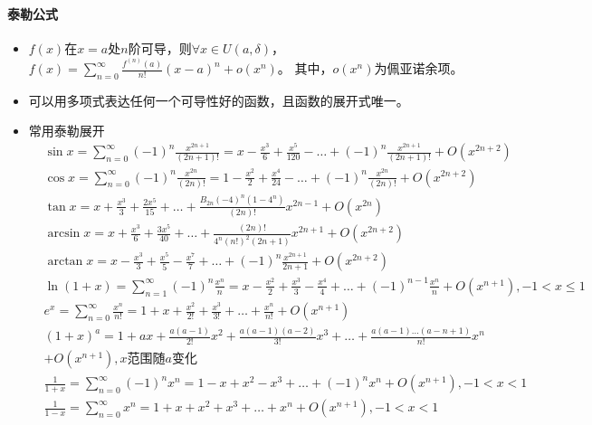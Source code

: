 \documentclass[
12pt, %
a4paper, 
oneside, %
headinclude,footinclude, %
]{scrartcl}
\begin{document}
\paragraph{泰勒公式}
\begin{itemize}
\item $ f(x) $在$ x = a $处$ n $阶可导，则$ \forall x \in U(a, \delta) $，
$ f(x) = \sum_{n = 0}^{\infty} \frac{f^{(n)}(a)}{n!}(x - a)^n + o(x^n) $。
其中，$ o(x^n) $为佩亚诺余项。
\item 可以用多项式表达任何一个可导性好的函数，且函数的展开式唯一。
\item 常用泰勒展开
\begin{align*}
&\sin x = \sum_{n = 0}^{\infty} (-1)^n \frac{x^{2n + 1}}{(2n + 1)!} = x - \frac{x^3}{6} + \frac{x^5}{120} - \dots + (-1)^n \frac{x^{2n + 1}}{(2n + 1)!} + O(x^{2n + 2}) \\
&\cos x = \sum_{n = 0}^{\infty} (-1)^n \frac{x^{2n}}{(2n)!} = 1 - \frac{x^2}{2} + \frac{x^4}{24} - \dots + (-1)^n \frac{x^{2n}}{(2n)!} + O(x^{2n + 2}) \\
&\tan x = x + \frac{x^3}{3} + \frac{2x^5}{15} + \dots + \frac{B_{2n} (-4)^n (1 - 4^n)}{(2n)!} x^{2n - 1} + O(x^{2n}) \\
&\arcsin x = x + \frac{x^3}{6} + \frac{3x^5}{40} + \dots + \frac{(2n)!}{4^n (n!)^2 (2n + 1)} x^{2n + 1} + O(x^{2n + 2}) \\
&\arctan x = x - \frac{x^3}{3} + \frac{x^5}{5} - \frac{x^7}{7} + \dots + (-1)^n \frac{x^{2n + 1}}{2n + 1} + O(x^{2n + 2}) \\
&\ln(1 + x) = \sum_{n = 1}^{\infty} (-1)^n \frac{x^n}{n} = x - \frac{x^2}{2} + \frac{x^3}{3} - \frac{x^4}{4} + \dots + (-1)^{n - 1} \frac{x^n}{n} + O(x^{n + 1}), -1 < x \leq 1 \\
&e^x = \sum_{n = 0}^{\infty} \frac{x^n}{n!} = 1 + x + \frac{x^2}{2!} + \frac{x^3}{3!} + \dots + \frac{x^n}{n!} + O(x^{n + 1}) \\
&(1 + x)^a = 1 + ax + \frac{a(a - 1)}{2!}x^2 + \frac{a(a - 1)(a - 2)}{3!}x^3 + \dots + \frac{a(a - 1)\dots(a - n + 1)}{n!}x^n \\
&+ O(x^{n + 1}), x \text{范围随} a \text{变化} \\
&\frac{1}{1 + x} = \sum_{n = 0}^{\infty} (-1)^n x^n = 1 - x + x^2 - x^3 + \dots + (-1)^n x^n + O(x^{n + 1}), -1 < x < 1 \\
&\frac{1}{1 - x} = \sum_{n = 0}^{\infty} x^n = 1 + x + x^2 + x^3 + \dots + x^n + O(x^{n + 1}), -1 < x < 1
\end{align*}
\end{itemize}
\end{document}
